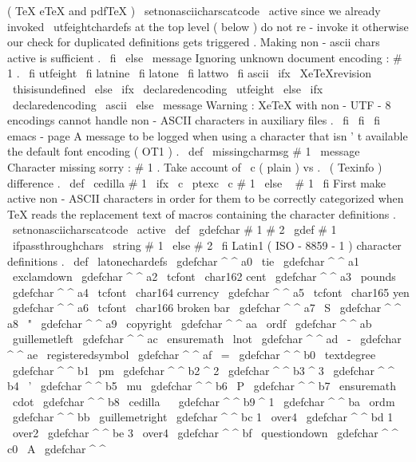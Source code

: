 {{{{{(
TeX
eTeX
and
pdfTeX
)
\
setnonasciicharscatcode
\
active
%
since
we
already
invoked
\
utfeightchardefs
at
the
top
level
%
(
below
)
do
not
re
-
invoke
it
otherwise
our
check
for
duplicated
%
definitions
gets
triggered
.
Making
non
-
ascii
chars
active
is
%
sufficient
.
\
fi
%
\
else
\
message
{
Ignoring
unknown
document
encoding
:
#
1
.
}
%
%
\
fi
%
utfeight
\
fi
%
latnine
\
fi
%
latone
\
fi
%
lattwo
\
fi
%
ascii
%
\
ifx
\
XeTeXrevision
\
thisisundefined
\
else
\
ifx
\
declaredencoding
\
utfeight
\
else
\
ifx
\
declaredencoding
\
ascii
\
else
\
message
{
Warning
:
XeTeX
with
non
-
UTF
-
8
encodings
cannot
handle
%
non
-
ASCII
characters
in
auxiliary
files
.
}
%
\
fi
\
fi
\
fi
}
%
emacs
-
page
%
A
message
to
be
logged
when
using
a
character
that
isn
'
t
available
%
the
default
font
encoding
(
OT1
)
.
%
\
def
\
missingcharmsg
#
1
{
\
message
{
Character
missing
sorry
:
#
1
.
}
}
%
Take
account
of
\
c
(
plain
)
vs
.
\
(
Texinfo
)
difference
.
\
def
\
cedilla
#
1
{
\
ifx
\
c
\
ptexc
\
c
{
#
1
}
\
else
\
{
#
1
}
\
fi
}
%
First
make
active
non
-
ASCII
characters
in
order
for
them
to
be
%
correctly
categorized
when
TeX
reads
the
replacement
text
of
%
macros
containing
the
character
definitions
.
\
setnonasciicharscatcode
\
active
%
\
def
\
gdefchar
#
1
#
2
{
%
\
gdef
#
1
{
%
\
ifpassthroughchars
\
string
#
1
%
\
else
#
2
%
\
fi
}
}
%
Latin1
(
ISO
-
8859
-
1
)
character
definitions
.
\
def
\
latonechardefs
{
%
\
gdefchar
^
^
a0
{
\
tie
}
\
gdefchar
^
^
a1
{
\
exclamdown
}
\
gdefchar
^
^
a2
{
{
\
tcfont
\
char162
}
}
%
cent
\
gdefchar
^
^
a3
{
\
pounds
{
}
}
\
gdefchar
^
^
a4
{
{
\
tcfont
\
char164
}
}
%
currency
\
gdefchar
^
^
a5
{
{
\
tcfont
\
char165
}
}
%
yen
\
gdefchar
^
^
a6
{
{
\
tcfont
\
char166
}
}
%
broken
bar
\
gdefchar
^
^
a7
{
\
S
}
\
gdefchar
^
^
a8
{
\
"
{
}
}
\
gdefchar
^
^
a9
{
\
copyright
{
}
}
\
gdefchar
^
^
aa
{
\
ordf
}
\
gdefchar
^
^
ab
{
\
guillemetleft
{
}
}
\
gdefchar
^
^
ac
{
\
ensuremath
\
lnot
}
\
gdefchar
^
^
ad
{
\
-
}
\
gdefchar
^
^
ae
{
\
registeredsymbol
{
}
}
\
gdefchar
^
^
af
{
\
=
{
}
}
%
\
gdefchar
^
^
b0
{
\
textdegree
}
\
gdefchar
^
^
b1
{
\
pm
}
\
gdefchar
^
^
b2
{
^
2
}
\
gdefchar
^
^
b3
{
^
3
}
\
gdefchar
^
^
b4
{
\
'
{
}
}
\
gdefchar
^
^
b5
{
\
mu
}
\
gdefchar
^
^
b6
{
\
P
}
\
gdefchar
^
^
b7
{
\
ensuremath
\
cdot
}
\
gdefchar
^
^
b8
{
\
cedilla
\
}
\
gdefchar
^
^
b9
{
^
1
}
\
gdefchar
^
^
ba
{
\
ordm
}
\
gdefchar
^
^
bb
{
\
guillemetright
{
}
}
\
gdefchar
^
^
bc
{
1
\
over4
}
\
gdefchar
^
^
bd
{
1
\
over2
}
\
gdefchar
^
^
be
{
3
\
over4
}
\
gdefchar
^
^
bf
{
\
questiondown
}
%
\
gdefchar
^
^
c0
{
\
A
}
\
gdefchar
^
^
}}}}}
